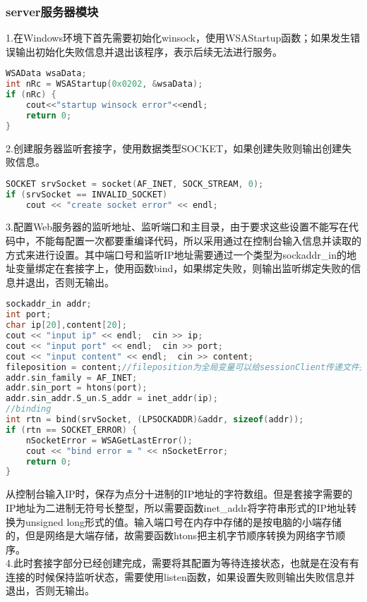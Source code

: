 \subsubsection{server服务器模块}
\hspace*{2em}1.在Windows环境下首先需要初始化winsock，使用WSAStartup函数；如果发生错误输出初始化失败信息并退出该程序，表示后续无法进行服务。\\
\begin{lstlisting}[language=c++]
WSAData wsaData;
int nRc = WSAStartup(0x0202, &wsaData);
if (nRc) {
	cout<<"startup winsock error"<<endl;
	return 0;
}
\end{lstlisting}
\hspace*{2em}2.创建服务器监听套接字，使用数据类型SOCKET，如果创建失败则输出创建失败信息。\\
\begin{lstlisting}[language=c++]
SOCKET srvSocket = socket(AF_INET, SOCK_STREAM, 0);
if (srvSocket == INVALID_SOCKET)
	cout << "create socket error" << endl;
\end{lstlisting}
\hspace*{2em}3.配置Web服务器的监听地址、监听端口和主目录，由于要求这些设置不能写在代码中，不能每配置一次都要重编译代码，所以采用通过在控制台输入信息并读取的方式来进行设置。其中端口号和监听IP地址需要通过一个类型为sockaddr\_in的地址变量绑定在套接字上，使用函数bind，如果绑定失败，则输出监听绑定失败的信息并退出，否则无输出。\\
\begin{lstlisting}[language=c++]
sockaddr_in addr;
int port;
char ip[20],content[20];
cout << "input ip" << endl;  cin >> ip;
cout << "input port" << endl;  cin >> port;
cout << "input content" << endl;  cin >> content;
fileposition = content;//fileposition为全局变量可以给sessionClient传递文件夹位置
addr.sin_family = AF_INET;
addr.sin_port = htons(port);
addr.sin_addr.S_un.S_addr = inet_addr(ip);
//binding
int rtn = bind(srvSocket, (LPSOCKADDR)&addr, sizeof(addr));
if (rtn == SOCKET_ERROR) {
	nSocketError = WSAGetLastError();
	cout << "bind error = " << nSocketError;
	return 0;
}
\end{lstlisting}
\hspace*{2em}从控制台输入IP时，保存为点分十进制的IP地址的字符数组。但是套接字需要的IP地址为二进制无符号长整型，所以需要函数inet\_addr将字符串形式的IP地址转换为unsigned long形式的值。输入端口号在内存中存储的是按电脑的小端存储的，但是网络是大端存储，故需要函数htons把主机字节顺序转换为网络字节顺序。\\
\hspace*{2em}4.此时套接字部分已经创建完成，需要将其配置为等待连接状态，也就是在没有有连接的时候保持监听状态，需要使用listen函数，如果设置失败则输出失败信息并退出，否则无输出。\\
